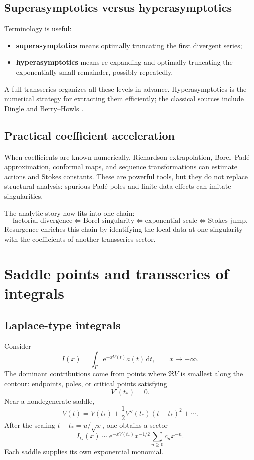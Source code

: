 \documentclass[11pt,openany]{book}
\theoremstyle{plain}
\theoremstyle{definition}
\theoremstyle{remark}
\newcommand{\dd}{\,\mathrm{d}}
\newcommand{\e}{\mathrm{e}}
\newcommand{\defterm}[1]{\textbf{#1}}
\begin{document}
\section{Superasymptotics versus hyperasymptotics}
Terminology is useful:
\begin{itemize}
\item \defterm{superasymptotics} means optimally truncating the first divergent series;
\item \defterm{hyperasymptotics} means re-expanding and optimally truncating the exponentially small remainder, possibly repeatedly.
\end{itemize}
A full transseries organizes all these levels in advance. Hyperasymptotics is the numerical strategy for extracting them efficiently; the classical sources include Dingle and Berry--Howls \cite{Dingle1973,BerryHowls1990}.

\section{Practical coefficient acceleration}
When coefficients are known numerically, Richardson extrapolation, Borel--Pad\'e approximation, conformal maps, and sequence transformations can estimate actions and Stokes constants. These are powerful tools, but they do not replace structural analysis: spurious Pad\'e poles and finite-data effects can imitate singularities.

\begin{checkpointbox}
The analytic story now fits into one chain:
\[
 \text{factorial divergence}
 \Longleftrightarrow
 \text{Borel singularity}
 \Longleftrightarrow
 \text{exponential scale}
 \Longleftrightarrow
 \text{Stokes jump}.
\]
Resurgence enriches this chain by identifying the local data at one singularity with the coefficients of another transseries sector.
\end{checkpointbox}

\chapter{Saddle points and transseries of integrals}
\label{chap:saddles}

\section{Laplace-type integrals}
Consider
\[
  I(x)=\int_\Gamma \e^{-xV(t)}a(t)\dd t,
  \qquad x\to+\infty.
  \label{eq:laplace-integral}
\]
The dominant contributions come from points where $\Re V$ is smallest along the contour: endpoints, poles, or critical points satisfying
\[
  V'(t_*)=0.
\]
Near a nondegenerate saddle,
\[
  V(t)=V(t_*)+\frac12V''(t_*)(t-t_*)^2+\cdots.
\]
After the scaling $t-t_*=u/\sqrt{x}$, one obtains a sector
\[
  I_{t_*}(x)
  \sim\e^{-xV(t_*)}x^{-1/2}
  \sum_{n\ge0}c_nx^{-n}.
  \label{eq:saddle-sector}
\]
Each saddle supplies its own exponential monomial.
\end{document}
